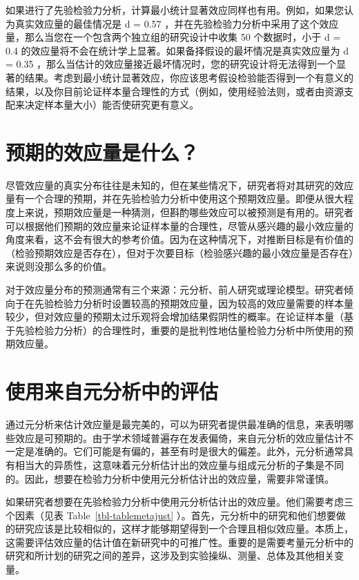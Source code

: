 \documentclass[
  letterpaper,
  DIV=11,
  numbers=noendperiod]{scrreprt}
\begin{document}
如果进行了先验检验力分析，计算最小统计显著效应同样也有用。例如，如果您认为真实效应量的最佳情况是
d = 0.57
，并在先验检验力分析中采用了这个效应量，那么当您在一个包含两个独立组的研究设计中收集
50 个数据时，小于 d = 0.4
的效应量将不会在统计学上显著。如果备择假设的最坏情况是真实效应量为 d =
0.35
，那么当估计的效应量接近最坏情况时，您的研究设计将无法得到一个显著的结果。考虑到最小统计显著效应，你应该思考假设检验能否得到一个有意义的结果，以及你目前论证样本量合理性的方式（例如，使用经验法则，或者由资源支配来决定样本量大小）能否使研究更有意义。

\hypertarget{ux9884ux671fux7684ux6548ux5e94ux91cfux662fux4ec0ux4e48}{%
\section{预期的效应量是什么？}\label{ux9884ux671fux7684ux6548ux5e94ux91cfux662fux4ec0ux4e48}}

尽管效应量的真实分布往往是未知的，但在某些情况下，研究者将对其研究的效应量有一个合理的预期，并在先验检验力分析中使用这个预期效应量。即便从很大程度上来说，预期效应量是一种猜测，但斟酌哪些效应可以被预测是有用的。研究者可以根据他们预期的效应量来论证样本量的合理性，尽管从感兴趣的最小效应量的角度来看，这不会有很大的参考价值。因为在这种情况下，对推断目标是有价值的（检验预期效应是否存在），但对于次要目标（检验感兴趣的最小效应量是否存在）来说则没那么多的价值。

对于效应量分布的预测通常有三个来源：元分析、前人研究或理论模型。研究者倾向于在先验检验力分析时设置较高的预期效应量，因为较高的效应量需要的样本量较少，但对效应量的预期太过乐观将会增加结果假阴性的概率。在论证样本量（基于先验检验力分析）的合理性时，重要的是批判性地估量检验力分析中所使用的预期效应量。

\hypertarget{ux4f7fux7528ux6765ux81eaux5143ux5206ux6790ux4e2dux7684ux8bc4ux4f30}{%
\section{使用来自元分析中的评估}\label{ux4f7fux7528ux6765ux81eaux5143ux5206ux6790ux4e2dux7684ux8bc4ux4f30}}

通过元分析来估计效应量是最完美的，可以为研究者提供最准确的信息，来表明哪些效应是可预期的。由于学术领域普遍存在发表偏倚，来自元分析的效应量估计不一定是准确的。它们可能是有偏的，甚至有时是很大的偏差。此外，元分析通常具有相当大的异质性，这意味着元分析估计出的效应量与组成元分析的子集是不同的。因此，想要在检验力分析中使用元分析估计出的效应量，需要非常谨慎。

如果研究者想要在先验检验力分析中使用元分析估计出的效应量。他们需要考虑三个因素（见表
Table~\ref{tbl-tablemetajust}
）。首先，元分析中的研究和他们想要做的研究应该是比较相似的，这样才能够期望得到一个合理且相似效应量。本质上，这需要评估效应量的估计值在新研究中的可推广性。重要的是需要考量元分析中的研究和所计划的研究之间的差异，这涉及到实验操纵、测量、总体及其他相关变量。
\end{document}
